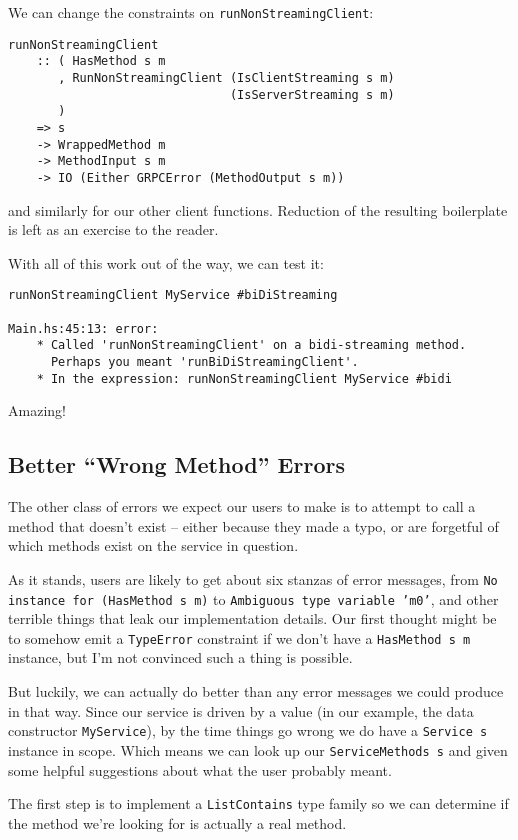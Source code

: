 {We can change the constraints on \texttt{runNonStreamingClient}:

\begin{verbatim}
runNonStreamingClient
    :: ( HasMethod s m
       , RunNonStreamingClient (IsClientStreaming s m)
                               (IsServerStreaming s m)
       )
    => s
    -> WrappedMethod m
    -> MethodInput s m
    -> IO (Either GRPCError (MethodOutput s m))
\end{verbatim}
and similarly for our other client functions. Reduction of the resulting boilerplate is left as an exercise to the reader.

With all of this work out of the way, we can test it:

\begin{verbatim}
runNonStreamingClient MyService #biDiStreaming

Main.hs:45:13: error:
    * Called 'runNonStreamingClient' on a bidi-streaming method.
      Perhaps you meant 'runBiDiStreamingClient'.
    * In the expression: runNonStreamingClient MyService #bidi
\end{verbatim}
Amazing!

\subsection{Better ``Wrong Method'' Errors}


The other class of errors we expect our users to make is to attempt to call a method that doesn't exist -- either because they made a typo, or are forgetful of which methods exist on the service in question.

As it stands, users are likely to get about six stanzas of error messages, from \texttt{No instance for (HasMethod s m)} to \texttt{Ambiguous type variable 'm0'}, and other terrible things that leak our implementation details. Our first thought might be to somehow emit a \texttt{TypeError} constraint if we don't have a \texttt{HasMethod s m} instance, but I'm not convinced such a thing is possible.

But luckily, we can actually do better than any error messages we could produce in that way. Since our service is driven by a value (in our example, the data constructor \texttt{MyService}), by the time things go wrong we do have a \texttt{Service s} instance in scope. Which means we can look up our \texttt{ServiceMethods s} and given some helpful suggestions about what the user probably meant.

The first step is to implement a \texttt{ListContains} type family so we can determine if the method we're looking for is actually a real method.

}
